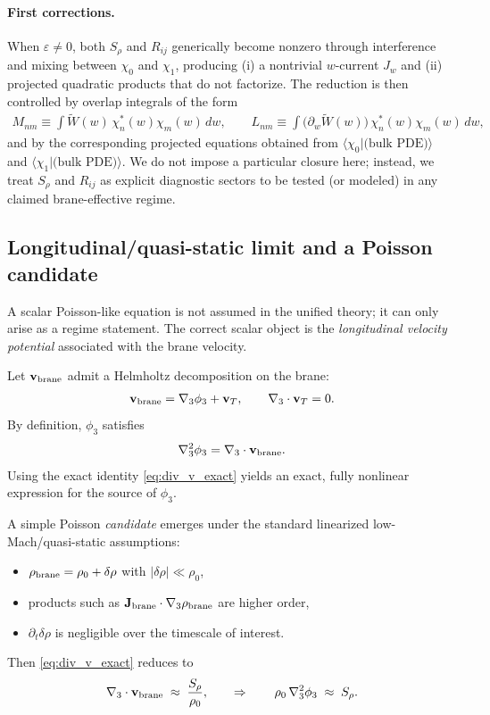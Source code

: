 \documentclass[11pt]{article}
\begin{document}
\paragraph{First corrections.}
When $\varepsilon\neq 0$, both $S_\rho$ and $R_{ij}$ generically become nonzero
through interference and mixing between $\chi_0$ and $\chi_1$, producing (i) a
nontrivial $w$-current $J_w$ and (ii) projected quadratic products that do not
factorize.  The reduction is then controlled by overlap integrals of the form
\begin{align}
M_{nm} \equiv \int \widetilde W(w)\,\chi_n^\ast(w)\chi_m(w)\,dw,
\qquad
L_{nm} \equiv \int \big(\partial_w \widetilde W(w)\big)\,\chi_n^\ast(w)\chi_m(w)\,dw,
\end{align}
and by the corresponding projected equations obtained from
$\langle\chi_0|\text{(bulk PDE)}\rangle$ and $\langle\chi_1|\text{(bulk PDE)}\rangle$.
We do not impose a particular closure here; instead, we treat
$S_\rho$ and $R_{ij}$ as explicit diagnostic sectors to be tested (or modeled)
in any claimed brane-effective regime.

\subsection{Longitudinal/quasi-static limit and a Poisson candidate}
\label{sec:poisson_candidate}

A scalar Poisson-like equation is not assumed in the unified theory; it can
only arise as a regime statement.  The correct scalar object is the
\emph{longitudinal velocity potential} associated with the brane velocity.

Let $\mathbf{v}_{\rm brane}$ admit a Helmholtz decomposition on the brane:
\begin{align}
\mathbf{v}_{\rm brane} = \nabla_3 \phi_3 + \mathbf{v}_T,
\qquad
\nabla_3\cdot \mathbf{v}_T = 0.
\label{eq:helmholtz}
\end{align}
By definition, $\phi_3$ satisfies
\begin{align}
\nabla_3^2 \phi_3 = \nabla_3\cdot \mathbf{v}_{\rm brane}.
\label{eq:phi_poisson_def}
\end{align}
Using the exact identity \eqref{eq:div_v_exact} yields an exact, fully
nonlinear expression for the source of $\phi_3$.

A simple Poisson \emph{candidate} emerges under the standard linearized
low-Mach/quasi-static assumptions:
\begin{itemize}
\item $\rho_{\rm brane}=\rho_0+\delta\rho$ with $|\delta\rho|\ll \rho_0$,
\item products such as $\mathbf{J}_{\rm brane}\cdot\nabla_3\rho_{\rm brane}$ are
      higher order,
\item $\partial_t \delta\rho$ is negligible over the timescale of interest.
\end{itemize}
Then \eqref{eq:div_v_exact} reduces to
\begin{align}
\nabla_3\cdot \mathbf{v}_{\rm brane} \;\approx\; \frac{S_\rho}{\rho_0},
\qquad\Rightarrow\qquad
\rho_0\,\nabla_3^2 \phi_3 \;\approx\; S_\rho.
\label{eq:poisson_candidate}
\end{align}
\end{document}
